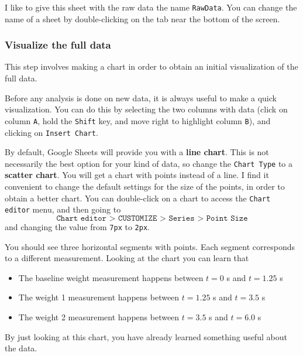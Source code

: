 I like to give this sheet with the raw data the name \texttt{RawData}. You can change the name of a sheet by double-clicking on the tab near the bottom of the screen.
%
\subsubsection{Visualize the full data}
%
This step involves making a chart in order to obtain an initial visualization of the full data.

Before any analysis is done on new data, it is always useful to make a quick visualization. You can do this by selecting the two columns with data (click on column \texttt{A}, hold the \texttt{Shift} key, and move right to highlight column \texttt{B}), and clicking on \texttt{Insert Chart}.

By default, Google Sheets will provide you with a \textbf{line chart}. This is not necessarily the best option for your kind of data, so change the \texttt{Chart Type} to a \textbf{scatter chart}. You will get a chart with points instead of a line. I find it convenient to change the default settings for the size of the points, in order to obtain a better chart. You can double-click on a chart to access the \texttt{Chart editor} menu, and then going to
\begin{equation}
    \texttt{Chart editor > CUSTOMIZE > Series > Point Size}
\end{equation}
and changing the value from \texttt{7px} to \texttt{2px}.

You should see three horizontal segments with points. Each segment corresponds to a different measurement. Looking at the chart you can learn that
\begin{itemize}
    \item The baseline weight measurement happens between $t = 0$ s and $t = 1.25$ s
    \item The weight 1 measurement happens between $t = 1.25$ s and $t = 3.5$ s
    \item The weight 2 measurement happens between $t = 3.5$ s and $t = 6.0$ s
\end{itemize}
By just looking at this chart, you have already learned something useful about the data.
%
\begin{center}
\end{center}
%
